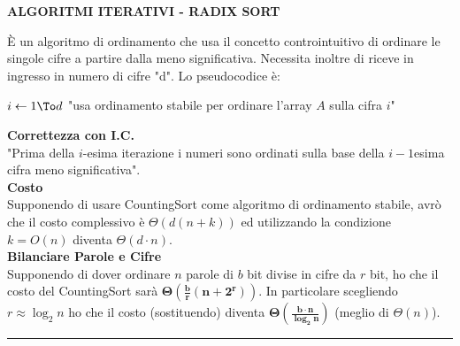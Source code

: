 \documentclass[8pt]{extarticle}
\newenvironment{formulario}
{
\setlength{\columnsep}{3em}
\twocolumn
\lstset{tabsize=3}
\begin{spacing}{1}
\begin{flushleft}
}{
\end{flushleft}
\end{spacing}
}
\newenvironment{tcenter}{
  \par
  \centering
  \setlength{\parskip}{0pt} %
  \noindent
}{
  \par
}
\newenvironment{code}[1]
{
\begin{codebox}
\Procname{$#1$}
}{
\end{codebox}
}
\newcommand{\myRule}{\rule{250pt}{0.1pt}}
\newcommand{\bo}[1]{\textbf{#1}}
\newcommand{\la}{\leftarrow}
\newcommand{\FOR}[1]{\For $#1$ \Do}
\begin{document}
\begin{formulario}
		\begin{tcenter}
\bo{ALGORITMI ITERATIVI - RADIX SORT}
		\end{tcenter}
È un algoritmo di ordinamento che usa il concetto controintuitivo di ordinare le singole cifre a partire dalla meno significativa. Necessita inoltre di riceve in ingresso in numero di cifre "d". Lo pseudocodice è: 
		\begin{code}{RadixSort(A,d)}
\li \FOR{i \la 1 \To d}
	\li "usa ordinamento stabile per ordinare l'array $A$ sulla cifra $i$"
\End
		\end{code}
\bo{Correttezza con I.C.}\\
"Prima della $i$-esima iterazione i numeri sono ordinati sulla base della $i-1$esima cifra meno significativa". \\
\bo{Costo}\\
Supponendo di usare CountingSort come algoritmo di ordinamento stabile, avrò che il costo complessivo è $\Theta(d(n+k))$ ed utilizzando la condizione $k=O(n)$ diventa $\Theta(d\cdot n)$. \\
\bo{Bilanciare Parole e Cifre} \\
Supponendo di dover ordinare $n$ parole di $b$ bit divise in cifre da $r$ bit, ho che il costo del CountingSort sarà $\bm{\Theta(\frac{b}{r}(n+2^r))}$. In particolare scegliendo $r\approx\log_2n$ ho che il costo (sostituendo) diventa $\bm{\Theta(\frac{b\cdot n}{\log_2n})}$ (meglio di $\Theta(n)$).
\myRule


\end{formulario}
\end{document}
